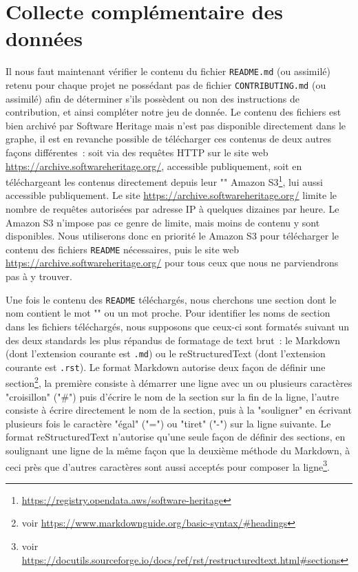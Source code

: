 \section{Collecte complémentaire des données}
\label{sec:collectreadme}

Il nous faut maintenant vérifier le contenu du fichier \texttt{README.md} (ou assimilé) retenu pour chaque
projet ne possédant pas de fichier \texttt{CONTRIBUTING.md} (ou assimilé) afin de déterminer s'ils possèdent
ou non des instructions de contribution, et ainsi compléter notre jeu de donnée. Le contenu des fichiers est
bien archivé par Software Heritage mais n'est pas disponible directement dans le graphe, il est en revanche
possible de télécharger ces contenus de deux autres façons différentes : soit via des requêtes HTTP sur le
site web \url{https://archive.softwareheritage.org/}, accessible publiquement, soit en téléchargeant les
contenus directement depuis leur "" Amazon
S3\footnote{\url{https://registry.opendata.aws/software-heritage}}, lui aussi accessible publiquement. Le site
\url{https://archive.softwareheritage.org/} limite le nombre de requêtes autorisées par adresse IP à quelques
dizaines par heure. Le  Amazon S3 n'impose pas ce genre de limite, mais moins de contenu y sont
disponibles. Nous utiliserons donc en priorité le  Amazon S3 pour télécharger le contenu des
fichiers \texttt{README} nécessaires, puis le site web \url{https://archive.softwareheritage.org/} pour tous
ceux que nous ne parviendrons pas à y trouver.

Une fois le contenu des \texttt{README} téléchargés, nous cherchons une section dont le nom contient le mot
"" ou un mot proche. Pour identifier les noms de section dans les fichiers téléchargés, nous
supposons que ceux-ci sont formatés suivant un des deux standards les plus répandus de formatage de text
brut : le Markdown (dont l'extension courante est \texttt{.md}) ou le reStructuredText (dont l'extension
courante est \texttt{.rst}). Le format Markdown autorise deux façon de définir une section\footnote{voir
\url{https://www.markdownguide.org/basic-syntax/\#headings}}, la première consiste à démarrer une ligne avec
un ou plusieurs caractères "croisillon" ("\#") puis d'écrire le nom de la section sur la fin de la ligne,
l'autre consiste à écrire directement le nom de la section, puis à la "souligner" en écrivant plusieurs fois
le caractère "égal" ("=") ou "tiret" ("-") sur la ligne suivante. Le format reStructuredText n'autorise qu'une
seule façon de définir des sections, en soulignant une ligne de la même façon que la deuxième méthode du
Markdown, à ceci près que d'autres caractères sont aussi acceptés pour composer la ligne\footnote{voir
\url{https://docutils.sourceforge.io/docs/ref/rst/restructuredtext.html\#sections}}.

